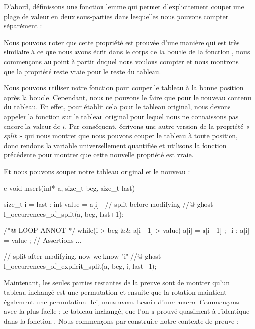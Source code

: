 D'abord, définissons une fonction lemme qui permet d'explicitement
couper une plage de valeur en deux sous-parties dans lesquelles nous pouvons
compter séparément :




Nous pouvons noter que cette propriété est prouvée d'une manière qui est très
similaire à ce que nous avons écrit dans le corps de la boucle de la fonction
, nous commençons au point à partir duquel nous
voulons compter et nous montrons que la propriété reste vraie pour le reste
du tableau.


Nous pouvons utiliser notre fonction pour couper le tableau à la bonne position
après la boucle. Cependant, nous ne pouvons le faire que pour le nouveau contenu
du tableau. En effet, pour établir cela pour le tableau original, nous devons
appeler la fonction sur le tableau original pour lequel nous ne connaissons pas
encore la valeur de $i$. Par conséquent, écrivons une autre version de la
propriété « \textit{split} » qui nous montrer que nous pouvons couper le tableau à toute
position, donc rendons la variable  universellement quantifiée
et utilisons la fonction précédente pour montrer que cette nouvelle propriété est
vraie.




Et nous pouvons souper notre tableau original et le nouveau :


\begin{CodeBlock}{c}
void insert(int* a, size_t beg, size_t last){
  size_t i = last ;
  int value = a[i] ;
  // split before modifying
  //@ ghost l_occurrences_of_split(a, beg, last+1);

  /*@ LOOP ANNOT */
  while(i > beg && a[i - 1] > value){
    a[i] = a[i - 1] ;
    --i ;
  }
  a[i] = value ;
  // Assertions ...

  // split after modifying, now we know "i"
  //@ ghost l_occurrences_of_explicit_split(a, beg, i, last+1);
}
\end{CodeBlock}


Maintenant, les seules parties restantes de la preuve sont de montrer qu'un tableau
inchangé est une permutation et ensuite que la rotation maintient également une
permutation. Ici, nous avons besoin d'une macro. Commençons avec la plus facile :
le tableau inchangé, que l'on a prouvé quasiment à l'identique dans la fonction
. Nous commençons par construire notre contexte de
preuve :


